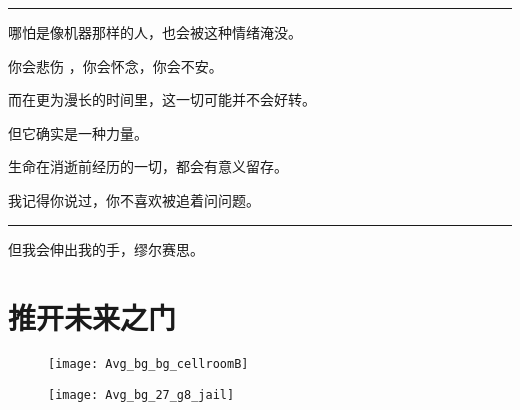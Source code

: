 \documentclass[openany]{book}
\begin{document}
\par\noindent\rule{\textwidth}{0.4pt}
哪怕是像机器那样的人，也会被这种情绪淹没。\par
你会悲伤 ，你会怀念，你会不安。\par
而在更为漫长的时间里，这一切可能并不会好转。\par
但它确实是一种力量。\par
生命在消逝前经历的一切，都会有意义留存。\par
我记得你说过，你不喜欢被追着问问题。
\par\noindent\rule{\textwidth}{0.4pt}

\begin{dialogue}
     但我会伸出我的手，缪尔赛思。
\end{dialogue}

\chapter{推开未来之门}
\begin{figure}[h]
    \centering
    \texttt{[image: Avg\_bg\_bg\_cellroomB]}
\end{figure}
\begin{figure}[h]
    \centering
    \texttt{[image: Avg\_bg\_27\_g8\_jail]}
\end{figure}
\end{document}
